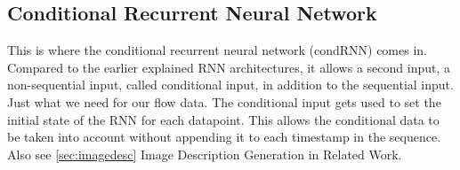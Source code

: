 \documentclass[
	ngerman,
	ruledheaders=section,%
	class=report,%
	thesis={type=bachelor},%
	accentcolor=9c,%
	custommargins=true,%
	marginpar=false,%
	parskip=half-,%
	fontsize=11pt,%
	twoside
]{tudapub}
\begin{document}



\subsection{Conditional Recurrent Neural Network}
\label{sec:condRNN}

This is where the conditional recurrent neural network (condRNN) \cite{remyPhilipperemyCondRnn2020} comes in.
Compared to the earlier explained RNN architectures, it allows a second input, a non-sequential input, called conditional input, in addition to the sequential input.
Just what we need for our flow data.
The conditional input gets used to set the initial state of the RNN for each datapoint.
This allows the conditional data to be taken into account without appending it to each timestamp in the sequence.
Also see \ref{sec:imagedesc} Image Description Generation in Related Work.
\end{document}

